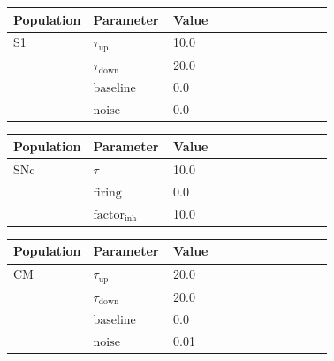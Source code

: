 \documentclass{article}
\begin{document}
\vspace{2ex}

\noindent
\begin{tabularx}{\linewidth}{|p{0.25\linewidth}|p{0.25\linewidth}|X|}\hline
\textbf{Population} & \textbf{Parameter} & \textbf{Value}   \\ \hline

    S1             & $\tau_{\text{up}}$        & 10.0  \\ \hline

                 & $\tau_{\text{down}}$        & 20.0  \\ \hline

                 & ${\text{baseline}}$        & 0.0  \\ \hline

                 & ${\text{noise}}$        & 0.0  \\ \hline

\end{tabularx}

\vspace{2ex}

\noindent
\begin{tabularx}{\linewidth}{|p{0.25\linewidth}|p{0.25\linewidth}|X|}\hline
\textbf{Population} & \textbf{Parameter} & \textbf{Value}   \\ \hline

    SNc             & $\tau$        & 10.0  \\ \hline

                 & ${\text{firing}}$        & 0.0  \\ \hline

                 & ${\text{factor}}_{\text{inh}}$        & 10.0  \\ \hline

\end{tabularx}

\vspace{2ex}

\noindent
\begin{tabularx}{\linewidth}{|p{0.25\linewidth}|p{0.25\linewidth}|X|}\hline
\textbf{Population} & \textbf{Parameter} & \textbf{Value}   \\ \hline

    CM             & $\tau_{\text{up}}$        & 20.0  \\ \hline

                 & $\tau_{\text{down}}$        & 20.0  \\ \hline

                 & ${\text{baseline}}$        & 0.0  \\ \hline

                 & ${\text{noise}}$        & 0.01  \\ \hline

\end{tabularx}
\end{document}
